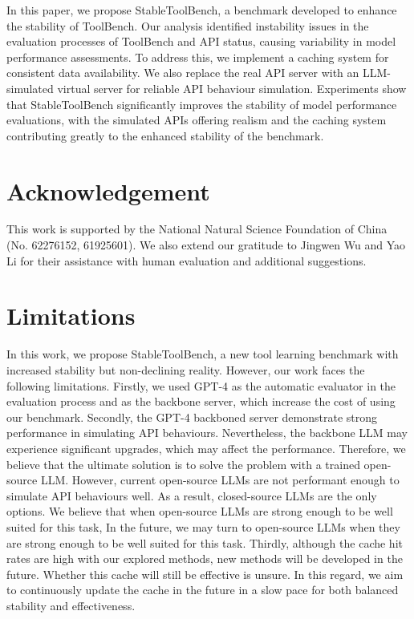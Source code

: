 \documentclass[11pt]{article}
\begin{document}
In this paper, we propose StableToolBench, a benchmark developed to enhance the stability of ToolBench. Our analysis identified instability issues in the evaluation processes of ToolBench and API status, causing variability in model performance assessments. To address this, we implement a caching system for consistent data availability. We also replace the real API server with an LLM-simulated virtual server for reliable API behaviour simulation. Experiments show that StableToolBench significantly improves the stability of model performance evaluations, with the simulated APIs offering realism and the caching system contributing greatly to the enhanced stability of the benchmark.

\section*{Acknowledgement}
This work is supported by the National Natural Science Foundation of China (No. 62276152, 61925601).
We also extend our gratitude to Jingwen Wu and Yao Li for their assistance with human evaluation and additional suggestions.
 
\section*{Limitations}
In this work, we propose StableToolBench, a new tool learning benchmark with increased stability but non-declining reality. However, our work faces the following limitations. Firstly, we used GPT-4 as the automatic evaluator in the evaluation process and as the backbone server, which increase the cost of using our benchmark. 
Secondly, the GPT-4 backboned server demonstrate strong performance in simulating API behaviours. Nevertheless, the backbone LLM may experience significant upgrades, which may affect the performance.
Therefore, we believe that the ultimate solution is to solve the problem with a trained open-source LLM. However, current open-source LLMs are not performant enough to simulate API behaviours well. As a result, closed-source LLMs are the only options. 
We believe that when open-source LLMs are strong enough to be well suited for this task, 
In the future, we may turn to open-source LLMs when they are strong enough to be well suited for this task.
Thirdly, although the cache hit rates are high with our explored methods, new methods will be developed in the future. Whether this cache will still be effective is unsure. In this regard, we aim to continuously update the cache in the future in a slow pace for both balanced stability and effectiveness. 
\end{document}
